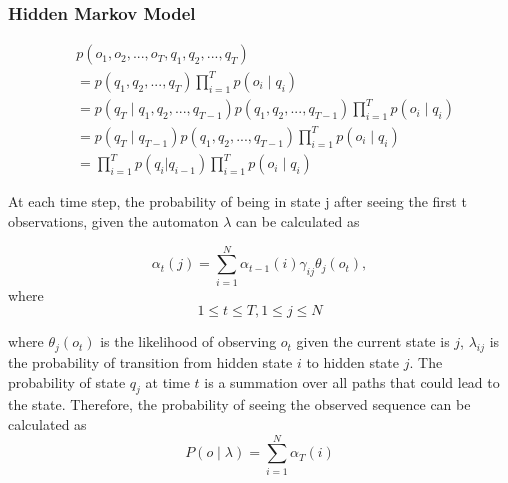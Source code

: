 \documentclass[notheorems, aspectratio=54]{beamer}
\begin{document}
\begin{frame}
\frametitle{Hidden Markov Model}

\begin{align*}
&p(o_1, o_2, ..., o_T, q_1, q_2, ..., q_T)\\
&=p(q_1, q_2, ..., q_T)\prod_{i=1}^{T} p(o_i\mid q_i)\\
&=p(q_T\mid q_1, q_2, ..., q_{T-1})p(q_1, q_2, ..., q_{T-1})\prod_{i=1}^{T}p(o_i\mid q_i)\\
&=p(q_T\mid q_{T-1})p(q_1, q_2, ..., q_{T-1})\prod_{i=1}^{T} p(o_i\mid q_i)\\
&=\prod_{i=1}^{T} p(q_i|q_{i-1})\prod_{i=1}^{T} p(o_i\mid q_i)
\end{align*}

\end{frame}
\begin{frame}
At each time step, the probability of being in state j after seeing the first t observations, given the automaton $\lambda$ can be calculated as 

$$
\alpha_{t}(j)=\sum_{i=1}^{N}\alpha_{t-1}(i) \gamma_{ij} \theta_j(o_t),
$$
where
$$ 1 \leq t\leq  T, 1\leq j \leq N
$$

where $\theta_j(o_t)$ is the likelihood of observing $o_t$ given the current state is $j$, $\lambda_{ij}$ is the probability of transition from hidden state $i$ to  hidden state $j$. The probability of state $q_j$ at time $t$ is a summation over all paths that could lead to the state. Therefore, the probability of seeing the observed sequence can be calculated as 
$$
P(o\mid \lambda)=\sum_{i=1}^{N}\alpha_{T}(i)
$$
\end{frame}
\end{document}
